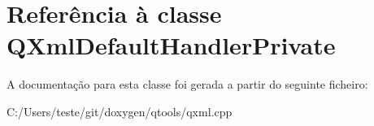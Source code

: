 \hypertarget{class_q_xml_default_handler_private}{\section{Referência à classe Q\-Xml\-Default\-Handler\-Private}
\label{class_q_xml_default_handler_private}
}


A documentação para esta classe foi gerada a partir do seguinte ficheiro\-:\begin{DoxyCompactItemize}
\item 
C\-:/\-Users/teste/git/doxygen/qtools/qxml.\-cpp\end{DoxyCompactItemize}
